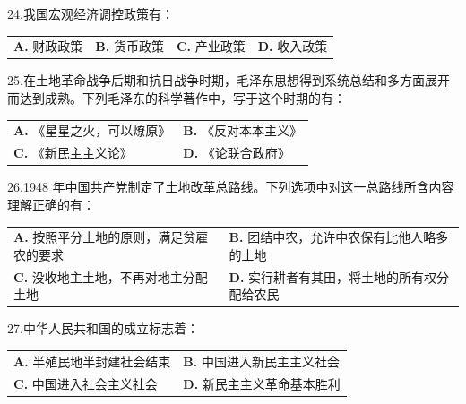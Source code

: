 \documentclass[UTF8,11pt]{ctexart}
\begin{document}
24.我国宏观经济调控政策有：


\begin{center}\begin{tabular}{>{\raggedright\arraybackslash}p{\dimexpr(\linewidth-8\tabcolsep)/4\relax}>{\raggedright\arraybackslash}p{\dimexpr(\linewidth-8\tabcolsep)/4\relax}>{\raggedright\arraybackslash}p{\dimexpr(\linewidth-8\tabcolsep)/4\relax}>{\raggedright\arraybackslash}p{\dimexpr(\linewidth-8\tabcolsep)/4\relax}}
\textbf{A.} 财政政策 & \textbf{B.} 货币政策 & \textbf{C.} 产业政策 & \textbf{D.} 收入政策\\[.35em]\end{tabular}\end{center}

25.在土地革命战争后期和抗日战争时期，毛泽东思想得到系统总结和多方面展开而达到成熟。下列毛泽东的科学著作中，写于这个时期的有：


\begin{center}\begin{tabular}{>{\raggedright\arraybackslash}p{\dimexpr(\linewidth-4\tabcolsep)/2\relax}>{\raggedright\arraybackslash}p{\dimexpr(\linewidth-4\tabcolsep)/2\relax}}
\textbf{A.} 《星星之火，可以燎原》 & \textbf{B.} 《反对本本主义》\\[.35em]
\textbf{C.} 《新民主主义论》 & \textbf{D.} 《论联合政府》\\[.35em]\end{tabular}\end{center}

26.1948 年中国共产党制定了土地改革总路线。下列选项中对这一总路线所含内容理解正确的有：


\begin{center}\begin{tabular}{>{\raggedright\arraybackslash}p{\dimexpr(\linewidth-4\tabcolsep)/2\relax}>{\raggedright\arraybackslash}p{\dimexpr(\linewidth-4\tabcolsep)/2\relax}}
\textbf{A.} 按照平分土地的原则，满足贫雇农的要求 & \textbf{B.} 团结中农，允许中农保有比他人略多的土地\\[.35em]
\textbf{C.} 没收地主土地，不再对地主分配土地 & \textbf{D.} 实行耕者有其田，将土地的所有权分配给农民\\[.35em]\end{tabular}\end{center}

27.中华人民共和国的成立标志着：


\begin{center}\begin{tabular}{>{\raggedright\arraybackslash}p{\dimexpr(\linewidth-4\tabcolsep)/2\relax}>{\raggedright\arraybackslash}p{\dimexpr(\linewidth-4\tabcolsep)/2\relax}}
\textbf{A.} 半殖民地半封建社会结束 & \textbf{B.} 中国进入新民主主义社会\\[.35em]
\textbf{C.} 中国进入社会主义社会 & \textbf{D.} 新民主主义革命基本胜利\\[.35em]\end{tabular}\end{center}
\end{document}
